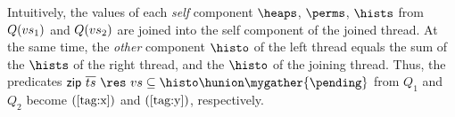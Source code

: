 %
Intuitively, the values of each \emph{self} component $\heaps$,
$\perms$, $\hists$ from $Q({vs}_1)$ and $Q({vs}_2)$ are joined into
the self component of the joined thread. At the same time, the
\emph{other} component $\histo$ of the left thread equals the sum of
the $\hists$ of the right thread, and the $\histo$ of the joining
thread. Thus, the predicates $\mathsf{zip}~\overline{\ts}~\res~\vvs
\subseteq \histo \hunion \mygather{\pending}$ from $Q_1$ and $Q_2$
become $(\ref{tag:x})$ and $(\ref{tag:y})$, respectively.

